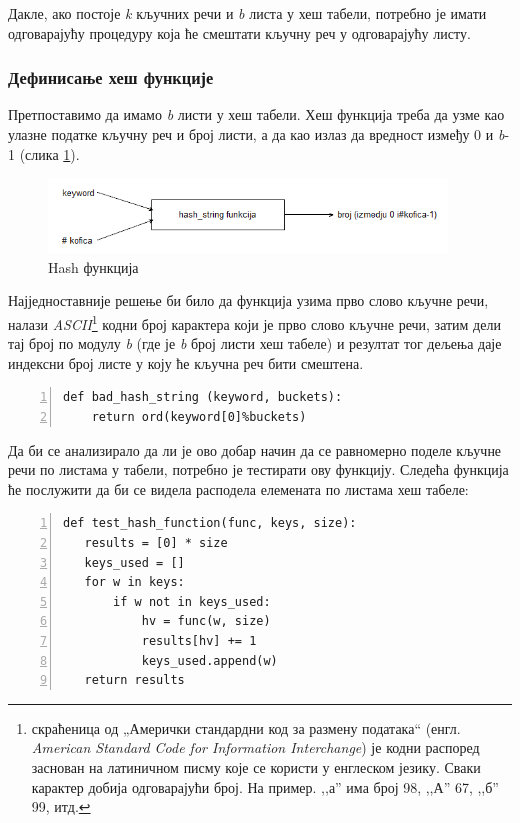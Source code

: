 Дакле, ако постоје \emph{k} кључних речи и \emph{b} листа у хеш табели, потребно је имати одговарајућу процедуру која ће смештати кључну реч у одговарајућу листу. \\

\subsubsection{Дефинисање хеш функције}

Претпоставимо да имамо \emph{b} листи у хеш табели. Хеш функција треба да узме као улазне податке кључну реч и број листи, а да као излаз да вредност између 0 и \emph{b}-1 (слика \ref{slike:hashstring}).

\begin{figure}[here]
\centering
\includegraphics[height=75px, width=400px]{hashstring.png}
\caption{Hash функција}
\label{slike:hashstring}
\end{figure}

Најједноставније решење би било да функција узима прво слово кључне речи, налази \emph{ASCII}\footnote{скраћеница од „Амерички стандардни код за размену података“ (енгл. \emph{American Standard Code for Information Interchange}) је кодни распоред заснован на латиничном писму које се користи у енглеском језику. Сваки карактер добија одговарајући број. На пример. ,,а'' има број 98, ,,А'' 67, ,,б'' 99, итд.} кодни број карактера који је прво слово кључне речи, затим дели тај број по модулу \emph{b} (где је \emph{b} број листи хеш табеле) и резултат тог дељења даје индексни број листе у коју ће кључна реч бити смештена.

\begin{lstlisting}[caption = Лоша хеш функција, label = {lst:badhash}, numbers = left]
def bad_hash_string (keyword, buckets):
    return ord(keyword[0]%buckets)
\end{lstlisting}

Да би се анализирало да ли је ово добар начин да се равномерно поделе кључне речи по листама у табели, потребно је тестирати ову функцију. Следећа функција ће послужити да би се видела расподела елемената по листама хеш табеле:

\begin{lstlisting}[caption = Тестирање хеш функције, label={lst:hashtest}, numbers=left]
def test_hash_function(func, keys, size):
   results = [0] * size
   keys_used = []
   for w in keys:
       if w not in keys_used:
           hv = func(w, size)
           results[hv] += 1
           keys_used.append(w)
   return results
\end{lstlisting}

